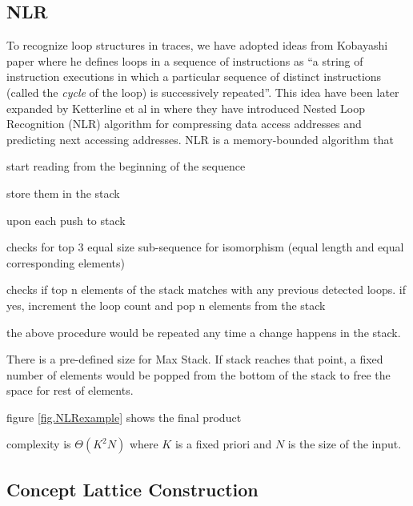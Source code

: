 
\subsection{NLR}
\label{subsec:algo-nlr}
To recognize loop structures in traces, we have adopted ideas from Kobayashi \cite{kobayashi-84} paper where he defines loops in a sequence of instructions as ``a string of instruction executions in which a particular sequence of distinct instructions (called the \textit{cycle} of the loop) is successively repeated''.
%
This idea have been later expanded by Ketterline et al in \cite{Ketterlin-nlr} where they have introduced Nested Loop Recognition (NLR) algorithm for compressing data access addresses and predicting next accessing addresses.
%
NLR is a memory-bounded algorithm that 

start reading from the beginning of the sequence

store them in the stack

upon each push to stack

	checks for top 3 equal size sub-sequence for isomorphism (equal length and equal corresponding elements)
	
	checks if top n elements of the stack matches with any previous detected loops. if yes, increment the loop count and pop n elements from the stack
	
the above procedure would be repeated any time a change happens in the stack. 

There is a pre-defined size for Max Stack. If stack reaches that point, a fixed number of elements would be popped from the bottom of the stack to free the space for rest of elements.

figure \ref{fig.NLRexample} shows the final product

complexity is $\Theta(K^2N)$ where $K$ is a fixed priori and $N$ is the size of the input. 
%



\subsection{Concept Lattice Construction}
\label{subsec:algo-cl}

